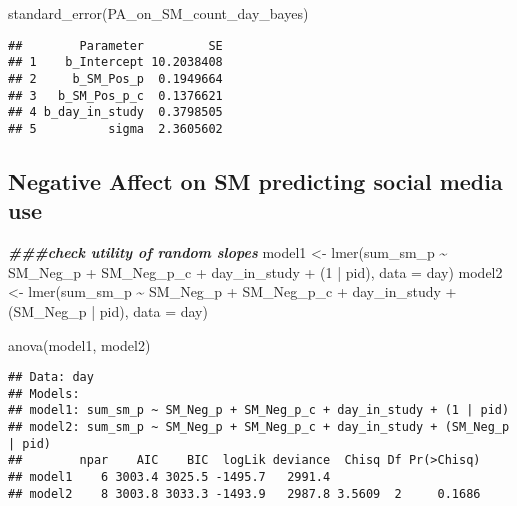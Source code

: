 \documentclass[
]{article}
\newenvironment{Shaded}{\begin{snugshade}}{\end{snugshade}}
\newcommand{\AttributeTok}[1]{\textcolor[rgb]{0.77,0.63,0.00}{#1}}
\newcommand{\DecValTok}[1]{\textcolor[rgb]{0.00,0.00,0.81}{#1}}
\newcommand{\DocumentationTok}[1]{\textcolor[rgb]{0.56,0.35,0.01}{\textbf{\textit{#1}}}}
\newcommand{\FunctionTok}[1]{\textcolor[rgb]{0.00,0.00,0.00}{#1}}
\newcommand{\NormalTok}[1]{#1}
\newcommand{\OtherTok}[1]{\textcolor[rgb]{0.56,0.35,0.01}{#1}}
\newcommand{\SpecialCharTok}[1]{\textcolor[rgb]{0.00,0.00,0.00}{#1}}
\begin{document}
\begin{Shaded}
\begin{Highlighting}[]
\FunctionTok{standard\_error}\NormalTok{(PA\_on\_SM\_count\_day\_bayes)}
\end{Highlighting}
\end{Shaded}

\begin{verbatim}
##        Parameter         SE
## 1    b_Intercept 10.2038408
## 2     b_SM_Pos_p  0.1949664
## 3   b_SM_Pos_p_c  0.1376621
## 4 b_day_in_study  0.3798505
## 5          sigma  2.3605602
\end{verbatim}

\hypertarget{negative-affect-on-sm-predicting-social-media-use}{%
\subsection{Negative Affect on SM predicting social media
use}\label{negative-affect-on-sm-predicting-social-media-use}}

\begin{Shaded}
\begin{Highlighting}[]
\DocumentationTok{\#\#\#check utility of random slopes}
\NormalTok{model1 }\OtherTok{\textless{}{-}} \FunctionTok{lmer}\NormalTok{(sum\_sm\_p }\SpecialCharTok{\textasciitilde{}}\NormalTok{ SM\_Neg\_p }\SpecialCharTok{+}\NormalTok{ SM\_Neg\_p\_c }\SpecialCharTok{+}\NormalTok{ day\_in\_study }\SpecialCharTok{+}\NormalTok{ (}\DecValTok{1} \SpecialCharTok{|}\NormalTok{ pid), }\AttributeTok{data =}\NormalTok{ day)}
\NormalTok{model2 }\OtherTok{\textless{}{-}} \FunctionTok{lmer}\NormalTok{(sum\_sm\_p }\SpecialCharTok{\textasciitilde{}}\NormalTok{ SM\_Neg\_p }\SpecialCharTok{+}\NormalTok{ SM\_Neg\_p\_c }\SpecialCharTok{+}\NormalTok{ day\_in\_study }\SpecialCharTok{+}\NormalTok{ (SM\_Neg\_p }\SpecialCharTok{|}\NormalTok{ pid), }\AttributeTok{data =}\NormalTok{ day)}

\FunctionTok{anova}\NormalTok{(model1, model2)}
\end{Highlighting}
\end{Shaded}

\begin{verbatim}
## Data: day
## Models:
## model1: sum_sm_p ~ SM_Neg_p + SM_Neg_p_c + day_in_study + (1 | pid)
## model2: sum_sm_p ~ SM_Neg_p + SM_Neg_p_c + day_in_study + (SM_Neg_p | pid)
##        npar    AIC    BIC  logLik deviance  Chisq Df Pr(>Chisq)
## model1    6 3003.4 3025.5 -1495.7   2991.4                     
## model2    8 3003.8 3033.3 -1493.9   2987.8 3.5609  2     0.1686
\end{verbatim}
\end{document}
